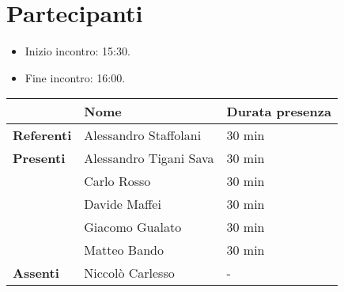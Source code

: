 \section*{Partecipanti}

\begin{itemize}
	\item Inizio incontro: 15:30.
	\item Fine incontro: 16:00.
\end{itemize}


\begin{center}
	{\renewcommand{\arraystretch}{1.5}
		\begin{tabular}{l|ll}
			                   & \textbf{Nome}          & \textbf{Durata presenza} \\
			\hline
			\textbf{Referenti} & Alessandro Staffolani  & 30 min                   \\
			\hline
			\textbf{Presenti}  & Alessandro Tigani Sava & 30 min                   \\
			                   & Carlo Rosso            & 30 min                   \\
			                   & Davide Maffei          & 30 min                   \\
			                   & Giacomo Gualato        & 30 min                   \\

			                   & Matteo Bando           & 30 min                   \\
			\hline
			\textbf{Assenti}   & Niccolò Carlesso       & -                        \\
		\end{tabular}
	}
\end{center}
